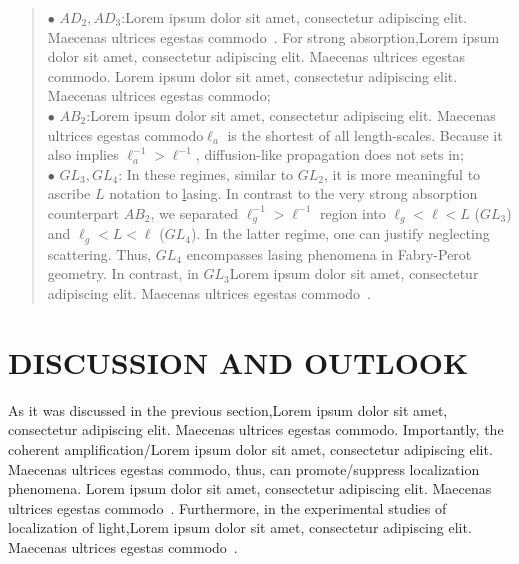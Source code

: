 \begin{quote}
$\bullet$ $AD_2,AD_3$:Lorem ipsum dolor sit amet, consectetur adipiscing elit. Maecenas ultrices egestas commodo~\cite{1998_Brouwer}. For strong absorption,Lorem ipsum dolor sit amet, consectetur adipiscing elit. Maecenas ultrices egestas commodo. Lorem ipsum dolor sit amet, consectetur adipiscing elit. Maecenas ultrices egestas commodo;\\
$\bullet$ $AB_2$:Lorem ipsum dolor sit amet, consectetur adipiscing elit. Maecenas ultrices egestas commodo$\ell_a$ is the shortest of all length-scales. Because it also implies $\ell_a^{-1}>\ell^{-1}$, diffusion-like propagation does not sets in;\\
$\bullet$ $GL_3,GL_4$: In these regimes, similar to $GL_2$, it is more meaningful to ascribe $L$ notation to {\underline l}asing. In contrast to the very strong absorption counterpart $AB_2$, we separated $\ell_g^{-1}>\ell^{-1}$ region into $\ell_g<\ell<L$ ($GL_3$) and $\ell_g<L<\ell$ ($GL_4$). In the latter regime, one can justify neglecting scattering. Thus, $GL_4$ encompasses lasing phenomena in Fabry-Perot geometry. In contrast, in $GL_3$Lorem ipsum dolor sit amet, consectetur adipiscing elit. Maecenas ultrices egestas commodo~\cite{2006_Wu,2006_Wu_spie}.\\
\end{quote}

\section{DISCUSSION AND OUTLOOK}
\label{sec:discussion_regimes}

As it was discussed in the previous section,Lorem ipsum dolor sit amet, consectetur adipiscing elit. Maecenas ultrices egestas commodo. Importantly, the coherent amplification/Lorem ipsum dolor sit amet, consectetur adipiscing elit. Maecenas ultrices egestas commodo, thus, can promote/suppress localization phenomena. Lorem ipsum dolor sit amet, consectetur adipiscing elit. Maecenas ultrices egestas commodo~\cite{1995_zyuzin_fluctuations,1997_Burkov_Zyuzin,2004_Yamilov_intensity,2005_Yamilov_correlations,2006_Yamilov_conductance,2010_Payne_loc_criterion,2010_Payne_TE}. Furthermore, in the experimental studies of localization of light,Lorem ipsum dolor sit amet, consectetur adipiscing elit. Maecenas ultrices egestas commodo~\cite{1991_Genack,1997_wiersma_nature,1999_Maret,2000_chabanov_nature,2006_Maret}. 

